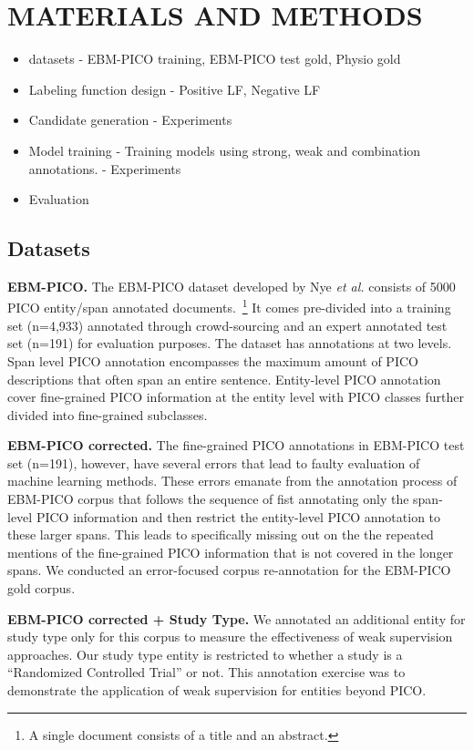 \documentclass[10.7pt,]{article}
\begin{document}
\section{MATERIALS AND METHODS}\label{methods}
%
\begin{itemize}
    \item datasets - EBM-PICO training, EBM-PICO test gold, Physio gold
    \item Labeling function design - Positive LF, Negative LF
    \item Candidate generation - Experiments
    \item Model training - Training models using strong, weak and combination annotations. - Experiments
    \item Evaluation
\end{itemize}
%
%
%
\subsection{Datasets}\label{data}
%
\textbf{EBM-PICO.} The EBM-PICO dataset developed by Nye \textit{et al.} consists of 5000 PICO entity/span annotated documents.~\footnote{A single document consists of a title and an abstract.}
It comes pre-divided into a training set (n=4,933) annotated through crowd-sourcing and an expert annotated test set (n=191) for evaluation purposes.
The dataset has annotations at two levels.
Span level PICO annotation encompasses the maximum amount of PICO descriptions that often span an entire sentence.
Entity-level PICO annotation cover fine-grained PICO information at the entity level with PICO classes further divided into fine-grained subclasses.


\textbf{EBM-PICO corrected.} The fine-grained PICO annotations in EBM-PICO test set (n=191), however, have several errors that lead to faulty evaluation of machine learning methods.
These errors emanate from the annotation process of EBM-PICO corpus that follows the sequence of fist annotating only the span-level PICO information and then restrict the entity-level PICO annotation to these larger spans.
This leads to specifically missing out on the the repeated mentions of the fine-grained PICO information that is not covered in the longer spans. 
We conducted an error-focused corpus re-annotation for the EBM-PICO gold corpus.


\textbf{EBM-PICO corrected + Study Type.} We annotated an additional entity for study type only for this corpus to measure the effectiveness of weak supervision approaches.
Our study type entity is restricted to whether a study is a ``Randomized Controlled Trial'' or not.
This annotation exercise was to demonstrate the application of weak supervision for entities beyond PICO.
\end{document}
